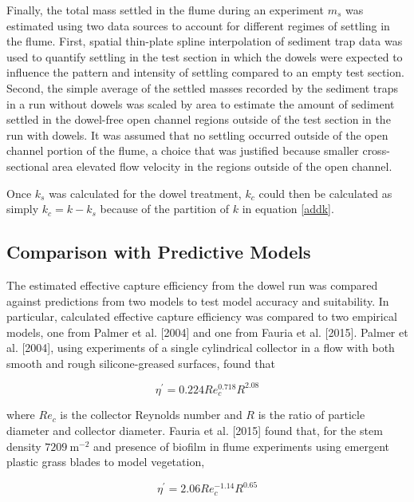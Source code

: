 \documentclass[12pt]{article}
\begin{document}
Finally, the total mass settled in the flume during an experiment $m_s$ was estimated using two data sources to account for different regimes of settling in the flume. First, spatial thin-plate spline interpolation of sediment trap data was used to quantify settling in the test section in which the dowels were expected to influence the pattern and intensity of settling compared to an empty test section. Second, the simple average of the settled masses recorded by the sediment traps in a run without dowels was scaled by area to estimate the amount of sediment settled in the dowel-free open channel regions outside of the test section in the run with dowels. It was assumed that no settling occurred outside of the open channel portion of the flume, a choice that was justified because smaller cross-sectional area elevated flow velocity in the regions outside of the open channel.

Once $k_s$ was calculated for the dowel treatment, $k_c$ could then be calculated as simply $k_c=k-k_s$ because of the partition of $k$ in equation \ref{addk}.

\subsection{Comparison with Predictive Models}

The estimated effective capture efficiency from the dowel run was compared against predictions from two models to test model accuracy and suitability. In particular, calculated effective capture efficiency was compared to two empirical models, one from Palmer et al. [2004] and one from Fauria et al. [2015]. Palmer et al. [2004], using experiments of a single cylindrical collector in a flow with both smooth and rough silicone-greased surfaces, found that

\begin{equation} \label{palmer}
    \eta^\prime=0.224 Re_c^{0.718} R^{2.08}
\end{equation}

\noindent where $Re_c$ is the collector Reynolds number and $R$ is the ratio of particle diameter and collector diameter. Fauria et al. [2015] found that, for the stem density $7209 \ \text{m}^{-2}$ and presence of biofilm in flume experiments using emergent plastic grass blades to model vegetation,

\begin{equation} \label{fauria}
    \eta^\prime=2.06 Re_c^{-1.14} R^{0.65}
\end{equation}
\end{document}
